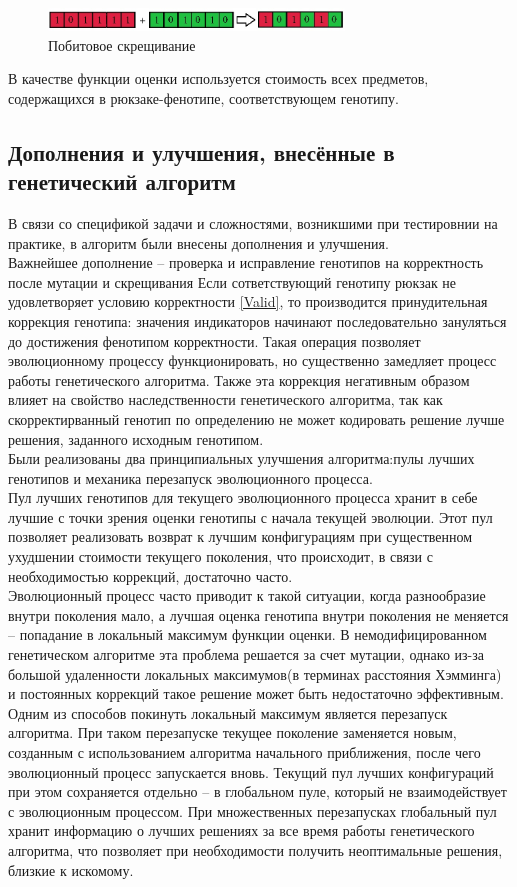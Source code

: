 	\begin{figure}[htbp]
	\includegraphics[width=0.7\textwidth]{./Pics/5.jpg}
	\caption{Побитовое скрещивание}
	\label{crossing3}
\end{figure}
\FloatBarrier
 В качестве функции оценки используется стоимость всех предметов, содержащихся в рюкзаке-фенотипе, соответствующем генотипу.
 
\subsection{Дополнения и улучшения, внесённые в\\ генетический алгоритм}\label{upgrades}
В связи со спецификой задачи и сложностями, возникшими при тестировнии на практике, в алгоритм были внесены дополнения и улучшения. 
\\Важнейшее дополнение -- проверка и исправление генотипов на корректность после мутации и скрещивания 
Если сответствующий генотипу рюкзак не удовлетворяет условию корректности \ref{Valid}, то производится принудительная коррекция генотипа: значения индикаторов начинают последовательно зануляться до достижения фенотипом корректности.
Такая операция позволяет эволюционному процессу функционировать, но существенно замедляет процесс работы генетического алгоритма.
Также эта коррекция негативным образом влияет на свойство наследственности генетического алгоритма, так как скорректирванный генотип по определению не может кодировать решение лучше решения, заданного исходным генотипом.\\
Были реализованы два принципиальных улучшения алгоритма:пулы лучших генотипов и механика перезапуск эволюционного процесса.\\
Пул лучших генотипов для текущего эволюционного процесса хранит в себе лучшие с точки зрения оценки генотипы с начала текущей эволюции. Этот пул позволяет реализовать возврат к лучшим конфигурациям при существенном ухудшении стоимости текущего поколения, что происходит, в связи с необходимостью коррекций, достаточно часто.\\
Эволюционный процесс часто приводит к такой ситуации, когда разнообразие внутри поколения мало, а лучшая оценка генотипа внутри поколения не меняется -- попадание в локальный максимум функции оценки. В немодифицированном генетическом алгоритме эта проблема решается за счет мутации, однако из-за большой удаленности локальных максимумов(в терминах расстояния Хэмминга) и постоянных коррекций такое решение может быть недостаточно эффективным. 
Одним из способов покинуть локальный максимум является перезапуск алгоритма. 
При таком перезапуске текущее поколение заменяется новым, созданным с использованием алгоритма начального приближения, после чего эволюционный процесс запускается вновь. Текущий пул лучших конфигураций при этом сохраняется отдельно -- в глобальном пуле, который не взаимодействует с эволюционным процессом.
 При множественных перезапусках глобальный пул хранит информацию о лучших решениях за все время работы генетического алгоритма, что позволяет при необходимости получить неоптимальные решения, близкие к искомому.
